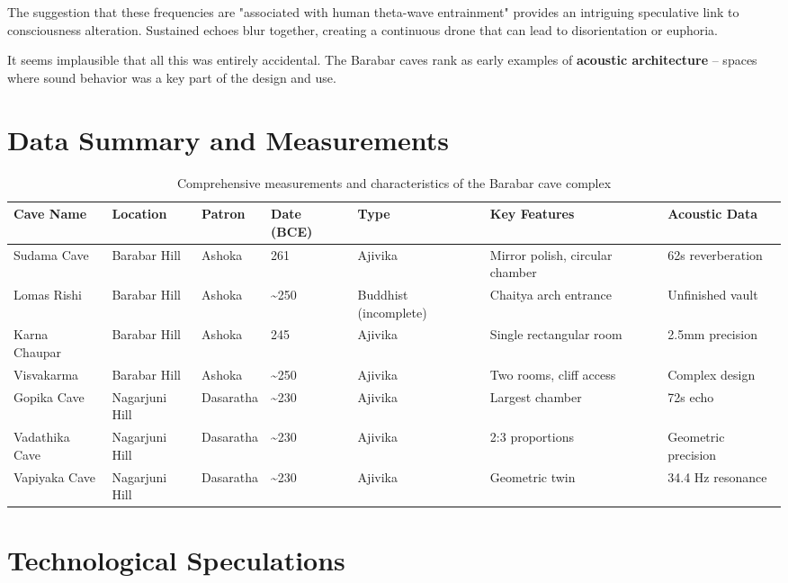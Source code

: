 \documentclass[11pt]{article}
\begin{document}
The suggestion that these frequencies are "associated with human theta-wave entrainment" provides an intriguing speculative link to consciousness alteration. Sustained echoes blur together, creating a continuous drone that can lead to disorientation or euphoria.

It seems implausible that all this was entirely accidental. The Barabar caves rank as early examples of \textbf{acoustic architecture} -- spaces where sound behavior was a key part of the design and use.

\section{Data Summary and Measurements}

\begin{table}[H]
\centering
\caption{Comprehensive measurements and characteristics of the Barabar cave complex}
\label{tab:cave_data}
\begin{tabular}{@{}lllllll@{}}
\toprule
\textbf{Cave Name} & \textbf{Location} & \textbf{Patron} & \textbf{Date (BCE)} & \textbf{Type} & \textbf{Key Features} & \textbf{Acoustic Data} \\
\midrule
Sudama Cave & Barabar Hill & Ashoka & 261 & Ajivika & Mirror polish, circular chamber & 62s reverberation \\
Lomas Rishi & Barabar Hill & Ashoka & \textasciitilde 250 & Buddhist (incomplete) & Chaitya arch entrance & Unfinished vault \\
Karna Chaupar & Barabar Hill & Ashoka & 245 & Ajivika & Single rectangular room & 2.5mm precision \\
Visvakarma & Barabar Hill & Ashoka & \textasciitilde 250 & Ajivika & Two rooms, cliff access & Complex design \\
Gopika Cave & Nagarjuni Hill & Dasaratha & \textasciitilde 230 & Ajivika & Largest chamber & 72s echo \\
Vadathika Cave & Nagarjuni Hill & Dasaratha & \textasciitilde 230 & Ajivika & 2:3 proportions & Geometric precision \\
Vapiyaka Cave & Nagarjuni Hill & Dasaratha & \textasciitilde 230 & Ajivika & Geometric twin & 34.4 Hz resonance \\
\bottomrule
\end{tabular}
\end{table}

\section{Technological Speculations}
\end{document}
